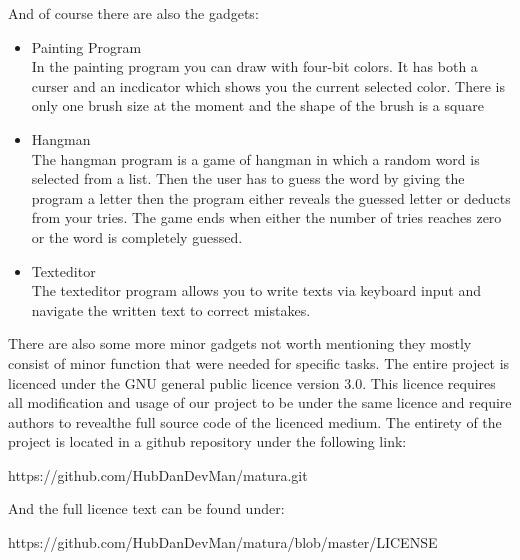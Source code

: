 And of course there are also the gadgets:

\begin{itemize}

\item Painting Program \\
In the painting program you can draw with four-bit colors. It has both a curser and an incdicator 
which shows you the current selected color. There is only one brush size at the moment and the
shape of the brush is a square

\item Hangman \\
The hangman program is a game of hangman in which a random word is selected from a list. Then the
user has to guess the word by giving the program a letter then the program either reveals the guessed
letter or deducts from your tries. The game ends when either the number of tries reaches zero or the
word is completely guessed.
\item Texteditor \\
The texteditor program allows you to write texts via keyboard input and navigate the written text to
correct mistakes.

\end{itemize}



There are also some more minor gadgets not worth mentioning they mostly consist of minor function that 
were needed for specific tasks. The entire project is licenced under the GNU general public licence version 
3.0. This licence requires all modification and usage of our project to be under the same licence and 
require authors to revealthe full source code of the licenced medium. The entirety of the project is located
in a github repository under the following link:

https://github.com/HubDanDevMan/matura.git

And the full licence text can be found under:

https://github.com/HubDanDevMan/matura/blob/master/LICENSE
